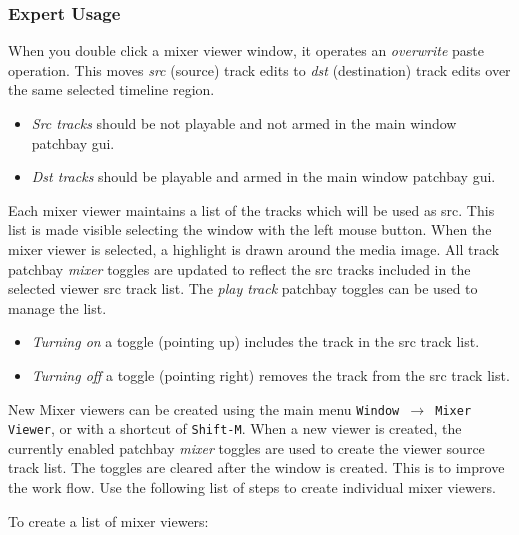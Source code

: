 \subsubsection*{Expert Usage}%
\label{ssub:expert_usage}

When you double click a mixer viewer window, it operates an \textit{overwrite} paste operation.  This moves \textit{src} (source) track edits to \textit{dst} (destination) track edits over the same selected timeline region.

\begin{itemize}[noitemsep]
	\item \textit{Src tracks} should be not playable and not armed in the main window patchbay gui.
	\item \textit{Dst tracks} should be playable and armed in the main window patchbay gui.
\end{itemize}

Each mixer viewer maintains a list of the tracks which will be used as src. This list is made visible selecting the window with the left mouse button.  When the mixer viewer is selected, a highlight is drawn around the media image.  All track patchbay \textit{mixer} toggles are updated to reflect the src tracks included in the selected viewer src track list. The \textit{play track} patchbay toggles can be used to manage the list.

\begin{itemize}[noitemsep]
	\item \textit{Turning on} a toggle (pointing up) includes the track in the src track list.
	\item \textit{Turning off} a toggle (pointing right) removes the track from the src track list.
\end{itemize}

New Mixer viewers can be created using the main menu \texttt{Window $\rightarrow$ Mixer Viewer}, or with a shortcut of \texttt{Shift-M}.  When a new viewer is created, the currently enabled patchbay \textit{mixer} toggles are used to create the viewer source track list.  The toggles are cleared after the window is created.  This is to improve the work flow.  Use the following list of steps to create individual mixer viewers.

To create a list of mixer viewers:

